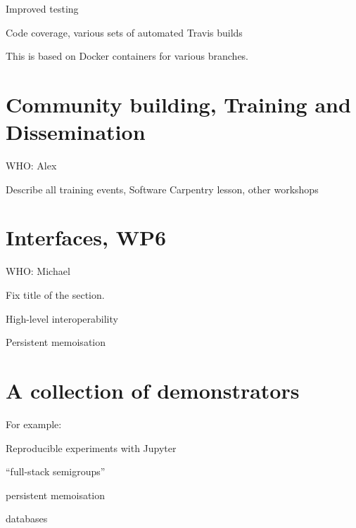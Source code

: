 \documentclass{deliverablereport}
\begin{document}
Improved testing

Code coverage, various sets of automated Travis builds

This is based on Docker containers for various branches.

\section{Community building, Training and Dissemination}

WHO: Alex

Describe all training events, Software Carpentry lesson, other workshops

\section{Interfaces, WP6}

WHO: Michael

Fix title of the section.

High-level interoperability

Persistent memoisation

\section{A collection of demonstrators}

For example:

Reproducible experiments with Jupyter

``full-stack semigroups''

persistent memoisation

databases
\end{document}
